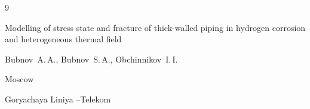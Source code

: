 \begin{thebibliography}{9}


\misctransl

\book Modelling of stress state and fracture of thick-walled piping in hydrogen corrosion and heterogeneous thermal field

\by  Bubnov~A.\,A., Bubnov~S.\,A., Obchinnikov~I.\,I.

\publaddr Moscow

\publ Goryachaya Liniya --Telekom 









\end{thebibliography}





\noindent

\hskip6.5cm \thedate \par\noindent

\hskip6.5cm\therevdate





\pagebreak






{}



\makeengtitlem







 \newpage

%


%

%


